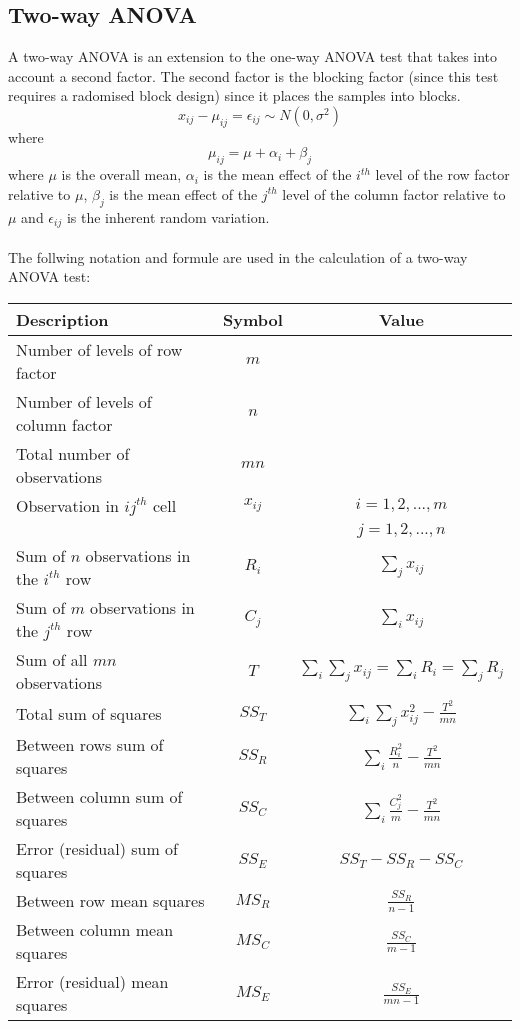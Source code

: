     \subsection{Two-way ANOVA}
        A two-way ANOVA is an extension to the one-way ANOVA test that takes into account a second factor. The second factor is the blocking factor (since this test requires a radomised block design) since it places the samples into blocks.
        $$
        x_{ij} - \mu_{ij} = \epsilon_{ij} \sim N(0, \sigma^2)
        $$
        where
        $$
        \mu_{ij} = \mu + \alpha_i + \beta_j
        $$
        where $\mu$ is the overall mean, $\alpha_i$ is the mean effect of the $i^{th}$ level of the row factor relative to $\mu$, $\beta_j$ is the mean effect of the $j^{th}$ level of the column factor relative to $\mu$ and $\epsilon_{ij}$ is the inherent random variation.\\
        \\
        The follwing notation and formule are used in the calculation of a two-way ANOVA test:
        \bgroup
        \def\arraystretch{2}
        \begin{center}
        \begin{tabular}{l|c|c}
        Description & Symbol & Value \\
        \hline
        Number of levels of row factor & $m$ & \\
        Number of levels of column factor & $n$ & \\
        Total number of observations & $mn$ & \\
        Observation in $ij^{th}$ cell & $x_{ij}$ & $i = 1, 2, ..., m$ \\
        & & $j = 1, 2, ..., n$  \\
        Sum of $n$ observations in the $i^{th}$ row & $R_i$ & $\sum_j{x_{ij}}$ \\
        Sum of $m$ observations in the $j^{th}$ row & $C_j$ & $\sum_i{x_{ij}}$ \\
        Sum of all $mn$ observations & $T$ & $\sum_i{\sum_j{x_{ij}}} = \sum_i{R_i} = \sum_j{R_j}$ \\
        \hline
        Total sum of squares & $SS_T$ & $\displaystyle\sum_i{\displaystyle\sum_j{x_{ij}^2}} - \frac{T^2}{mn}$ \\
        Between rows sum of squares & $SS_R$ & $\displaystyle\sum_i{\frac{R_i^2}{n}} - \frac{T^2}{mn}$ \\
        Between column sum of squares & $SS_C$ & $\displaystyle\sum_i{\frac{C_j^2}{m}} - \frac{T^2}{mn}$ \\
        Error (residual) sum of squares & $SS_E$ & $SS_T - SS_R - SS_C$ \\
        \hline
        Between row mean squares & $MS_R$ & $\displaystyle\frac{SS_R}{n - 1}$ \\
        Between column mean squares & $MS_C$ & $\displaystyle\frac{SS_C}{m - 1}$ \\
        Error (residual) mean squares & $MS_E$ & $\displaystyle\frac{SS_E}{mn - 1}$ \\
        \end{tabular}
        \end{center}
        \egroup
        \noindent
        
